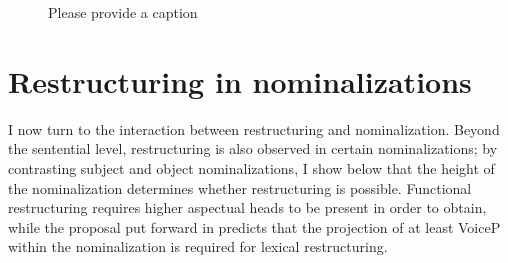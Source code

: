 \documentclass[output=paper]{langscibook}
\begin{document}
\begin{figure}
\caption{\color{red}Please provide a caption\label{fig:haninkwarmupstructure}}
\end{figure}



\section{Restructuring in nominalizations}\label{haninksec:3}

I now turn to the interaction between restructuring and nominalization. Beyond the sentential level, restructuring is also observed in certain nominalizations; by contrasting subject and object nominalizations, I show below  that the height of the nominalization determines whether restructuring is possible. Functional restructuring requires higher aspectual heads to be present in order to obtain, while the proposal put forward in  predicts that the projection of at least VoiceP  within the nominalization is required for lexical restructuring. %
\end{document}
